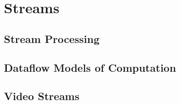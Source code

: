 \chapter{Streams}
\label{chapter:streams}


\section{Stream Processing}
\label{sec:stream-processing}


\section{Dataflow Models of Computation}
\label{sec:dataflow-models}


\section{Video Streams}
\label{sec:video-streams}

